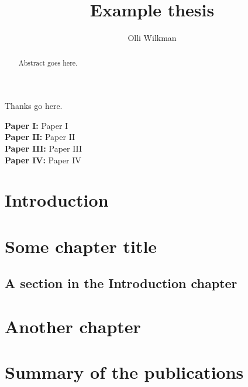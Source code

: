 \documentclass[a4paper,11pt,english]{report}
\title{Example thesis}
\author{Olli Wilkman}
\begin{document}
\frontmatter

\maketitle

\begin{abstract}
	Abstract goes here.
\end{abstract}

\begin{acknowledgements}
	Thanks go here.
\end{acknowledgements}

\begin{publications}
	\textbf{Paper I:} Paper I \\
	\newline
	\textbf{Paper II:} Paper II \\
	\newline
	\textbf{Paper III:} Paper III \\
	\newline
	\textbf{Paper IV:} Paper IV
\end{publications}

\pagestyle{headings}
\tableofcontents


\mainmatter

\chapter{Introduction}

\chapter{Some chapter title}

\section{A section in the Introduction chapter}


\chapter{Another chapter}



\chapter{Summary of the publications}
\end{document}
